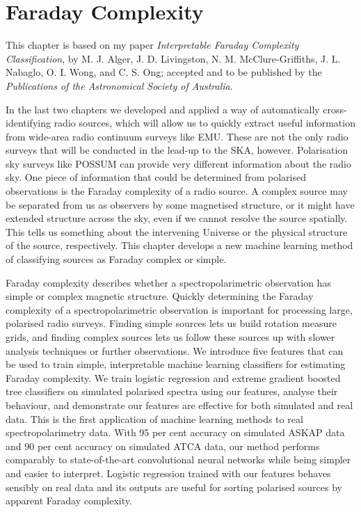 \chapter{Faraday Complexity}
\label{cha:faraday}

This chapter is based on my paper \emph{Interpretable Faraday Complexity Classification}, by M. J. Alger, J. D. Livingston, N. M. McClure-Griffiths, J. L. Nabaglo, O. I. Wong, and C. S. Ong; accepted and to be published by the \emph{Publications of the Astronomical Society of Australia}.

In the last two chapters we developed and applied a way of automatically cross-identifying radio sources, which will allow us to quickly extract useful information from wide-area radio continuum surveys like EMU. These are not the only radio surveys that will be conducted in the lead-up to the SKA, however. Polarisation sky surveys like POSSUM can provide very different information about the radio sky. One piece of information that could be determined from polarised observations is the Faraday complexity of a radio source. A complex source may be separated from us as observers by some magnetised structure, or it might have extended structure across the sky, even if we cannot resolve the source spatially. This tells us something about the intervening Universe or the physical structure of the source, respectively. This chapter develops a new machine learning method of classifying sources as Faraday complex or simple.

Faraday complexity describes whether a spectropolarimetric observation has simple or complex magnetic structure. Quickly determining the Faraday complexity of a spectropolarimetric observation is important for processing large, polarised radio surveys. Finding simple sources lets us build rotation measure grids, and finding complex sources lets us follow these sources up with slower analysis techniques or further observations. We introduce five features that can be used to train simple, interpretable machine learning classifiers for estimating Faraday complexity. We train logistic regression and extreme gradient boosted tree classifiers on simulated polarised spectra using our features, analyse their behaviour, and demonstrate our features are effective for both simulated and real data. This is the first application of machine learning methods to real spectropolarimetry data. With 95 per cent accuracy on simulated ASKAP data and 90 per cent accuracy on simulated ATCA data, our method performs comparably to state-of-the-art convolutional neural networks while being simpler and easier to interpret. Logistic regression trained with our features behaves sensibly on real data and its outputs are useful for sorting polarised sources by apparent Faraday complexity.


